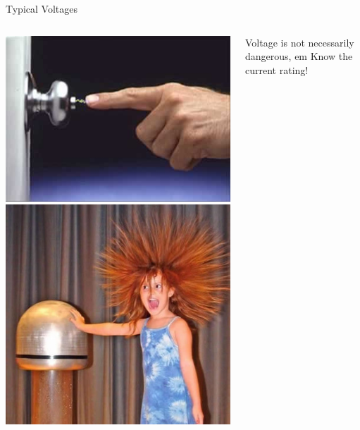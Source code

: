 \documentclass{presentation}
\begin{document}
\begin{frame}{Typical Voltages}
  \begin{columns}
    \begin{column}{0.33\textwidth}
      \includegraphics[width=\textwidth]{"./doorknob.png"}
      \includegraphics[width=\textwidth]{"./hair.png"}
    \end{column}
    \begin{column}{0.67\textwidth}
        Voltage is not necessarily dangerous,
         em
        Know the current rating!
    \end{column}
  \end{columns}
\end{frame}
\end{document}
